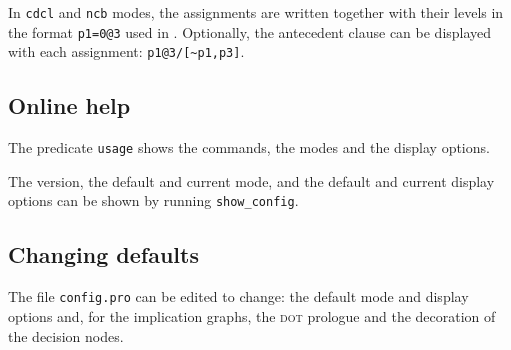\documentclass[11pt]{report}
\newcommand*{\p}[1]{\textup{\texttt{#1}}}
\newcommand*{\dt}{\textsc{dot}}
\begin{document}
In \p{cdcl} and \p{ncb} modes, the assignments are written together with
their levels in the format \p{p1=0@3} used in \cite{mlm}. Optionally,
the antecedent clause can be displayed with each assignment:
\verb+p1@3/[~p1,p3]+.


\subsection{Online help}

The predicate \p{usage} shows the commands, the modes and the display
options.

The version, the default and current mode, and the default and current
display options can be shown by running \p{show\_config}.

\subsection{Changing defaults}

The file \p{config.pro} can be edited to change: the default mode and
display options and, for the implication graphs, the \dt{} prologue and
the decoration of the decision nodes.
\end{document}
